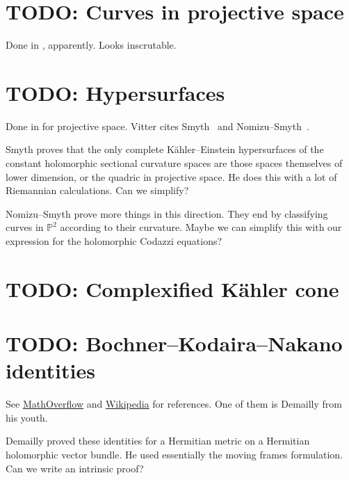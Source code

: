 \documentclass[11pt]{article}
\newcommand{\kk}[1]{\mathbb{#1}}
\begin{document}
\section{TODO: Curves in projective space}

Done in \cite{fischer1983differential}, apparently. Looks inscrutable.

\section{TODO: Hypersurfaces}

Done in \cite{vitter1974curvature} for projective space. Vitter cites Smyth~\cite{smyth1967differential} and Nomizu--Smyth~\cite{nomizu1968differential}.

Smyth proves that the only complete K\"ahler--Einstein hypersurfaces of the constant holomorphic sectional curvature spaces are those spaces themselves of lower dimension, or the quadric in projective space. He does this with a lot of Riemannian calculations. Can we simplify?

Nomizu--Smyth prove more things in this direction. They end by classifying curves in $\kk P^2$ according to their curvature. Maybe we can simplify this with our expression for the holomorphic Codazzi equations?


\section{TODO: Complexified K\"ahler cone}
\label{sec:complexified-kahler-cone}



\section{TODO: Bochner--Kodaira--Nakano identities}
\label{sec:bochn-koda-nakano}

See
\hyperlink{https://mathoverflow.net/questions/289779/where-do-the-akizuki-nakano-identities-first-appear}{MathOverflow}
and
\hyperlink{https://en.wikipedia.org/wiki/Bochner\%E2\%80\%93Kodaira\%E2\%80\%93Nakano_identity}{Wikipedia}
for references. One of them is Demailly from his youth.

Demailly proved these identities for a Hermitian metric on a Hermitian holomorphic vector bundle. He used essentially the moving frames formulation. Can we write an intrinsic proof?





\end{document}

